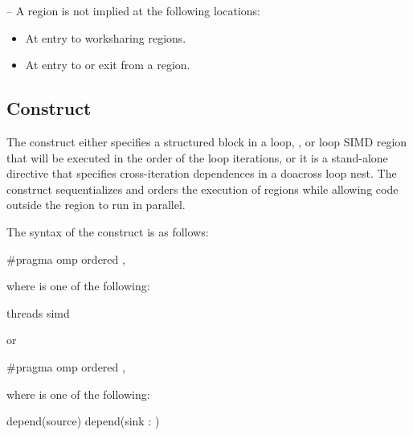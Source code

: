 {{{{\notestart
\noteheader – A  region is not implied at the following locations:

\begin{itemize}
\item At entry to worksharing regions.

\item At entry to or exit from a  region.
\end{itemize}
\noteend










\subsection{ Construct}
\label{subsec:ordered Construct}
\summary
The  construct either specifies a structured block in a loop,
, or loop SIMD region that will be executed in the order of the
loop iterations, or it is a stand-alone directive that specifies
cross-iteration dependences in a doacross loop nest. The 
construct sequentializes and orders the execution of  regions
while allowing code outside the region to run in parallel.

\begin{samepage}
\syntax
\ccppspecificstart
The syntax of the  construct is as follows:

\begin{boxedcode}
\#pragma omp ordered \plc{[clause[ [},\plc{] clause] ]} 
\end{boxedcode}

where  is one of the following:
\begin{indentedcodelist}
threads
simd
\end{indentedcodelist}

or

\begin{boxedcode}
\#pragma omp ordered \plc{clause [[[},\plc{] clause] ... ]} 
\end{boxedcode}
where  is one of the following:
\begin{indentedcodelist}
depend(source)
depend(sink : )
\end{indentedcodelist}



\end{samepage}}}}}
